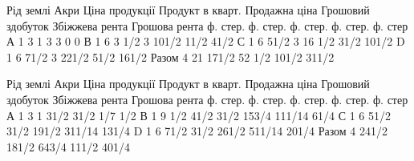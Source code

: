 Рід землі    Акри    Ціна продукції    Продукт в кварт. Продажна  ціна    Грошовий  здобуток   
Збіжжева рента    Грошова  рента
        ф. стер. ф. стер. ф. стер. ф. стер. ф. стер
А 1 3 1 3 3 0 0
В                    1    6    3 1/2    3    101/2    11/2    41/2
С                    1    6    51/2    3    16 1/2    31/2    101/2
D                    1    6    71/2    3    221/2    51/2    161/2
Разом          4    21    171/2        52 1/2    101/2    311/2

Рід землі    Акри    Ціна продукції    Продукт в кварт. Продажна  ціна    Грошовий  здобуток   
Збіжжева рента    Грошова  рента
        ф. стер. ф. стер. ф. стер. ф. стер. ф. стер
А                    1    3             1            31/2       31/2        1/7            1/2
В                    1    9 1/2       41/2    31/2       153/4        111/14    61/4
С                    1    6             51/2    31/2        191/2        311/14    131/4
D                    1    6             71/2    31/2        261/2        511/14     201/4
Разом           4    241/2    181/2           643/4    111/2            401/4
\parbreak{}  %
